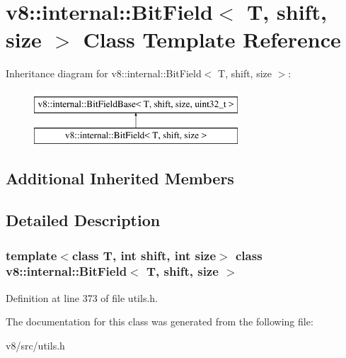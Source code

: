 \hypertarget{classv8_1_1internal_1_1BitField}{}\section{v8\+:\+:internal\+:\+:Bit\+Field$<$ T, shift, size $>$ Class Template Reference}
\label{classv8_1_1internal_1_1BitField}
Inheritance diagram for v8\+:\+:internal\+:\+:Bit\+Field$<$ T, shift, size $>$\+:\begin{figure}[H]
\begin{center}
\leavevmode
\includegraphics[height=2.000000cm]{classv8_1_1internal_1_1BitField}
\end{center}
\end{figure}
\subsection*{Additional Inherited Members}


\subsection{Detailed Description}
\subsubsection*{template$<$class T, int shift, int size$>$\newline
class v8\+::internal\+::\+Bit\+Field$<$ T, shift, size $>$}



Definition at line 373 of file utils.\+h.



The documentation for this class was generated from the following file\+:\begin{DoxyCompactItemize}
\item 
v8/src/utils.\+h\end{DoxyCompactItemize}
